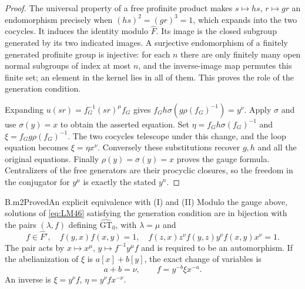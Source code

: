 \begin{proof}
The universal property of a free profinite product makes $s\mapsto hs$, $r\mapsto gr$ an endomorphism precisely when $(hs)^2=(gr)^3=1$, which expands into the two cocycles. It induces the identity modulo $\widehat F$. Its image is the closed subgroup generated by its two indicated images. A surjective endomorphism of a finitely generated profinite group is injective: for each $n$ there are only finitely many open normal subgroups of index at most $n$, and the inverse-image map permutes this finite set; an element in the kernel lies in all of them. This proves the role of the generation condition.

Expanding $u(sr)=f_G^{-1}(sr)^\mu f_G$ gives
$f_Gh\sigma(g\rho(f_G)^{-1})=y^\nu$.
Apply $\sigma$ and use $\sigma(y)=x$ to obtain the asserted equation. Set
$\eta=f_Gh\sigma(f_G)^{-1}$ and
$\xi=f_Gg\rho(f_G)^{-1}$.
The two cocycles telescope under this change, and the loop equation becomes $\xi=\eta x^\nu$. Conversely these substitutions recover $g,h$ and all the original equations. Finally $\rho(y)=\sigma(y)=x$ proves the gauge formula. Centralizers of the free generators are their procyclic closures, so the freedom in the conjugator for $y^\mu$ is exactly the stated $y^n$.
\end{proof}

\begin{claim}{B.m2}{Proved}{An explicit equivalence with (I) and (II)}
Modulo the gauge above, solutions of \eqref{eq:LM46} satisfying the generation condition are in bijection with the pairs $(\lambda,f)$ defining $\widehat{\mathrm{GT}}_0$, with $\lambda=\mu$ and
\[
 f\in\widehat F',\quad
 f(y,x)f(x,y)=1,\quad
 f(z,x)z^\nu f(y,z)y^\nu f(x,y)x^\nu=1.
\]
The pair acts by $x\mapsto x^\mu$, $y\mapsto f^{-1}y^\mu f$ and is required to be an automorphism. If the abelianization of $\xi$ is $a[x]+b[y]$, the exact change of variables is
\begin{equation}\label{eq:normalization-GT}
 a+b=\nu,\qquad f=y^{-b}\xi x^{-a}.
\end{equation}
An inverse is $\xi=y^\nu f$, $\eta=y^\nu fx^{-\nu}$.

\end{claim}


